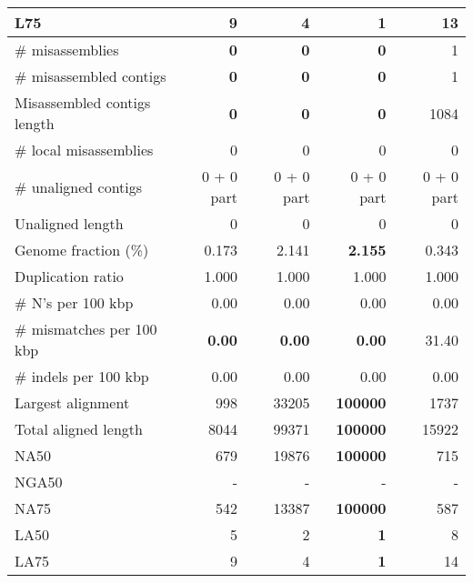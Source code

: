 \documentclass[12pt,a4paper]{article}
\begin{document}
\begin{table}[ht]
\begin{center}
\begin{tabular}{|l*{4}{|r}|}
L75 & 9 & 4 & {\bf 1} & 13 \\ \hline
\# misassemblies & {\bf 0} & {\bf 0} & {\bf 0} & 1 \\ \hline
\# misassembled contigs & {\bf 0} & {\bf 0} & {\bf 0} & 1 \\ \hline
Misassembled contigs length & {\bf 0} & {\bf 0} & {\bf 0} & 1084 \\ \hline
\# local misassemblies & 0 & 0 & 0 & 0 \\ \hline
\# unaligned contigs & 0 + 0 part & 0 + 0 part & 0 + 0 part & 0 + 0 part \\ \hline
Unaligned length & 0 & 0 & 0 & 0 \\ \hline
Genome fraction (\%) & 0.173 & 2.141 & {\bf 2.155} & 0.343 \\ \hline
Duplication ratio & 1.000 & 1.000 & 1.000 & 1.000 \\ \hline
\# N's per 100 kbp & 0.00 & 0.00 & 0.00 & 0.00 \\ \hline
\# mismatches per 100 kbp & {\bf 0.00} & {\bf 0.00} & {\bf 0.00} & 31.40 \\ \hline
\# indels per 100 kbp & 0.00 & 0.00 & 0.00 & 0.00 \\ \hline
Largest alignment & 998 & 33205 & {\bf 100000} & 1737 \\ \hline
Total aligned length & 8044 & 99371 & {\bf 100000} & 15922 \\ \hline
NA50 & 679 & 19876 & {\bf 100000} & 715 \\ \hline
NGA50 & - & - & - & - \\ \hline
NA75 & 542 & 13387 & {\bf 100000} & 587 \\ \hline
LA50 & 5 & 2 & {\bf 1} & 8 \\ \hline
LA75 & 9 & 4 & {\bf 1} & 14 \\ \hline
\end{tabular}
\end{center}
\end{table}
\end{document}

